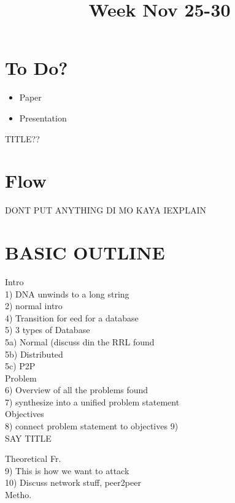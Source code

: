 \documentclass{article}
\begin{document}
\title{Week Nov 25-30}

\maketitle
\section{To Do?}

\begin{itemize}
    \item Paper
    \item Presentation
\end{itemize}

TITLE??


\section{Flow}

DONT PUT ANYTHING DI MO KAYA IEXPLAIN \\
\section{BASIC OUTLINE}
Intro \\
1) DNA unwinds to a long string \\
2) normal intro \\
4) Transition for eed for a database \\
5) 3 types of Database\\
5a) Normal (discuss din the RRL found \\
5b) Distributed \\
5c) P2P \\

Problem \\
6) Overview of all the problems found \\

7) synthesize into a unified problem statement \\

Objectives \\
8) connect problem statement to objectives 9) \\ SAY TITLE


Theoretical Fr. \\
9) This is how we want to attack \\
10) Discuss network stuff, peer2peer \\


Metho. \\
\end{document}
